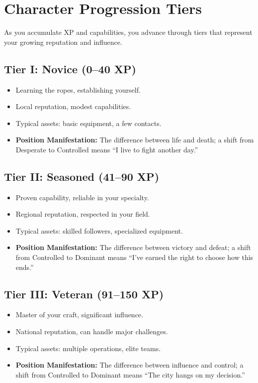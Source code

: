 \newpage
\section{Character Progression Tiers}
\label{sec:tiers}

As you accumulate XP and capabilities, you advance through tiers that represent your growing reputation and influence.

\subsection{Tier I: Novice (0--40 XP)}
\label{sec:tier-i}
\begin{itemize}
\item Learning the ropes, establishing yourself.
\item Local reputation, modest capabilities.
\item Typical assets: basic equipment, a few contacts.
\item \textbf{Position Manifestation:} The difference between life and death; a shift from Desperate to Controlled means ``I live to fight another day.''
\end{itemize}

\subsection{Tier II: Seasoned (41--90 XP)}
\label{sec:tier-ii}
\begin{itemize}
\item Proven capability, reliable in your specialty.
\item Regional reputation, respected in your field.
\item Typical assets: skilled followers, specialized equipment.
\item \textbf{Position Manifestation:} The difference between victory and defeat; a shift from Controlled to Dominant means ``I've earned the right to choose how this ends.''
\end{itemize}

\subsection{Tier III: Veteran (91--150 XP)}
\label{sec:tier-iii}
\begin{itemize}
\item Master of your craft, significant influence.
\item National reputation, can handle major challenges.
\item Typical assets: multiple operations, elite teams.
\item \textbf{Position Manifestation:} The difference between influence and control; a shift from Controlled to Dominant means ``The city hangs on my decision.''
\end{itemize}

